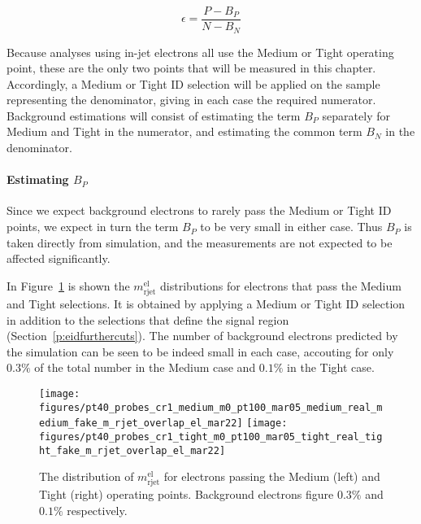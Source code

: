 \begin{equation}\label{eqn:effo}
	\epsilon = \frac{P-B_P}{N-B_N}
\end{equation}

Because analyses using in-jet electrons all use the Medium or Tight operating
point, these are the only two points that will be measured in this chapter.
Accordingly, a Medium or Tight ID selection will be applied on the sample
representing the denominator, giving in each case the required numerator.
Background estimations will consist of estimating the term $B_P$ separately for
Medium and Tight in the numerator, and estimating the common term $B_N$ in the
denominator.

\paragraph{Estimating $B_P$} Since we expect background electrons to rarely
pass the Medium or Tight ID points, we expect in turn the term $B_P$ to be very
small in either case. Thus $B_P$ is taken directly from simulation, and the
measurements are not expected to be affected significantly.

In Figure~\ref{f:eidmedium} is shown the $m_{\text{rjet}}^{\text{el}}$
distributions for electrons that pass the Medium and Tight selections. It is
obtained by applying a Medium or Tight ID selection in addition to the
selections that define the signal region (Section~\ref{p:eidfurthercuts}). The
number of background electrons predicted by the simulation can be seen to be
indeed small in each case, accouting for only $0.3\%$ of the total number in
the Medium case and $0.1\%$ in the Tight case.


\begin{figure}[H]
	\texttt{[image: figures/pt40\_probes\_cr1\_medium\_m0\_pt100\_mar05\_medium\_real\_medium\_fake\_m\_rjet\_overlap\_el\_mar22]}
	\texttt{[image: figures/pt40\_probes\_cr1\_tight\_m0\_pt100\_mar05\_tight\_real\_tight\_fake\_m\_rjet\_overlap\_el\_mar22]}

	\centering

	\caption{The distribution of $m_{\text{rjet}}^{\text{el}}$ for electrons passing
		the Medium (left) and Tight (right) operating points. Background electrons figure $0.3\%$ and
		$0.1\%$ respectively.}

	\label{f:eidmedium}

\end{figure}



